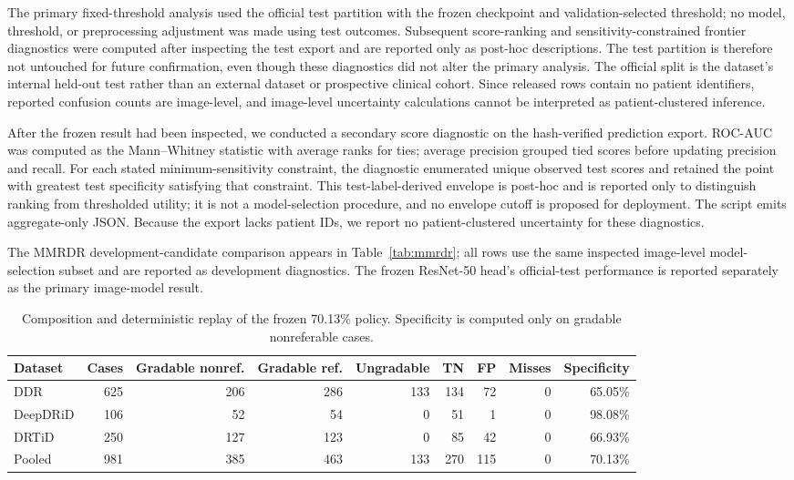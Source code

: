 \documentclass{ieeeaccess}
\begin{document}
The primary fixed-threshold analysis used the official test partition with the frozen checkpoint and validation-selected threshold; no model, threshold, or preprocessing adjustment was made using test outcomes. Subsequent score-ranking and sensitivity-constrained frontier diagnostics were computed after inspecting the test export and are reported only as post-hoc descriptions. The test partition is therefore not untouched for future confirmation, even though these diagnostics did not alter the primary analysis. The official split is the dataset's internal held-out test rather than an external dataset or prospective clinical cohort. Since released rows contain no patient identifiers, reported confusion counts are image-level, and image-level uncertainty calculations cannot be interpreted as patient-clustered inference.

After the frozen result had been inspected, we conducted a secondary score diagnostic on the hash-verified prediction export. ROC-AUC was computed as the Mann--Whitney statistic with average ranks for ties; average precision grouped tied scores before updating precision and recall. For each stated minimum-sensitivity constraint, the diagnostic enumerated unique observed test scores and retained the point with greatest test specificity satisfying that constraint. This test-label-derived envelope is post-hoc and is reported only to distinguish ranking from thresholded utility; it is not a model-selection procedure, and no envelope cutoff is proposed for deployment. The script emits aggregate-only JSON. Because the export lacks patient IDs, we report no patient-clustered uncertainty for these diagnostics.

The MMRDR development-candidate comparison appears in Table~\ref{tab:mmrdr}; all rows use the same inspected image-level model-selection subset and are reported as development diagnostics. The frozen ResNet-50 head's official-test performance is reported separately as the primary image-model result.

\begin{table}[t]
\centering
\caption{Composition and deterministic replay of the frozen 70.13\% policy. Specificity is computed only on gradable nonreferable cases.}
\label{tab:source}
\begin{tabular}{lrrrrrrrr}
\toprule
Dataset & Cases & Gradable nonref. & Gradable ref. & Ungradable & TN & FP & Misses & Specificity \\
\midrule
DDR & 625 & 206 & 286 & 133 & 134 & 72 & 0 & 65.05\% \\
DeepDRiD & 106 & 52 & 54 & 0 & 51 & 1 & 0 & 98.08\% \\
DRTiD & 250 & 127 & 123 & 0 & 85 & 42 & 0 & 66.93\% \\
\midrule
Pooled & 981 & 385 & 463 & 133 & 270 & 115 & 0 & 70.13\% \\
\bottomrule
\end{tabular}
\end{table}
\end{document}
